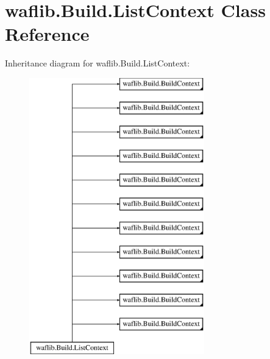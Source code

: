 \hypertarget{classwaflib_1_1_build_1_1_list_context}{}\section{waflib.\+Build.\+List\+Context Class Reference}
\label{classwaflib_1_1_build_1_1_list_context}
Inheritance diagram for waflib.\+Build.\+List\+Context\+:\begin{figure}[H]
\begin{center}
\leavevmode
\includegraphics[height=12.000000cm]{classwaflib_1_1_build_1_1_list_context}
\end{center}
\end{figure}

